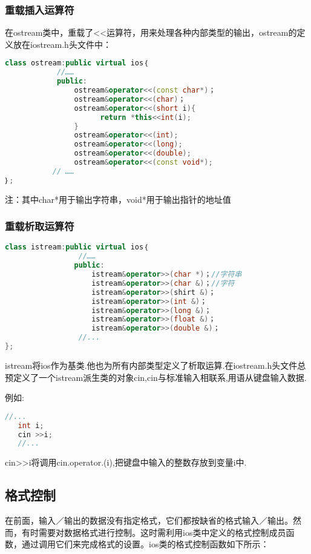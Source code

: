 \documentclass{article}
\begin{document}
\subsubsection{重载插入运算符}
\label{sec-10-2-1}

在ostream类中，重载了<<运算符，用来处理各种内部类型的输出，ostream的定义放在iostream.h头文件中：
\begin{lstlisting}[language=c++]
class ostream:public virtual ios｛
            //……
            public:
                ostream&operator<<(const char*)；
                ostream&operator<<(char)； 
                ostream&operator<<(short i){
                      return *this<<int(i);
                }
                ostream&operator<<(int);
                ostream&operator<<(long);
                ostream&operator<<(double);
                ostream&operator<<(const void*); 
           // ……
｝;
\end{lstlisting}
注：其中char*用于输出字符串，void*用于输出指针的地址值 
\subsubsection{重载析取运算符}
\label{sec-10-2-2}
\begin{lstlisting}[language=c++]
class istream:public virtual ios｛
                 //……
                public:
                    istream&operator>>(char *)；//字符串
                    istream&operator>>(char &)；//字符 
                    istream&operator>>(shirt &)；
                    istream&operator>>(int &)；
                    istream&operator>>(long &)；
                    istream&operator>>(float &)；
                    istream&operator>>(double &)；
                 //...
};
\end{lstlisting}
istream将ios作为基类.他也为所有内部类型定义了析取运算.在iostream.h头文件总预定义了一个istream派生类的对象cin,cin与标准输入相联系,用语从键盘输入数据.

例如:
\begin{lstlisting}[language=c++]
   //...
   int i;
   cin >>i;
   //...
\end{lstlisting}
cin>>i将调用cin.operator.(i),把键盘中输入的整数存放到变量i中.
\subsection{格式控制}
\label{sec-10-3}

在前面，输入／输出的数据没有指定格式，它们都按缺省的格式输入／输出。然而，有时需要对数据格式进行控制。这时需利用ios类中定义的格式控制成员函数，通过调用它们来完成格式的设置。ios类的格式控制函数如下所示：
\end{document}
